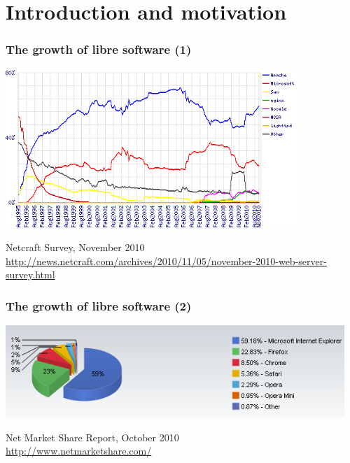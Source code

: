
\section{Introduction and motivation}


\begin{frame}
\frametitle{The growth of libre software (1)}

\includegraphics[height=6cm]{webservers-share-2010-11}

\begin{flushright}
Netcraft Survey, November 2010 \\
{\small \url{http://news.netcraft.com/archives/2010/11/05/november-2010-web-server-survey.html}}
\end{flushright}
\end{frame}


\begin{frame}
\frametitle{The growth of libre software (2)}

\includegraphics[height=3.5cm]{webbrowsers-share-2010-10}

\begin{flushright}
Net Market Share Report, October 2010 \\
{\small \url{http://www.netmarketshare.com/}}
\end{flushright}
\end{frame}

